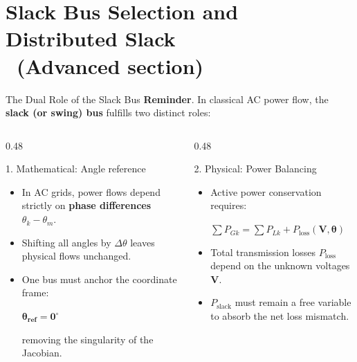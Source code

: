 \section{Slack Bus Selection and Distributed Slack \\ (Advanced section)}

\begin{frame}{The Dual Role of the Slack Bus}
    \textbf{Reminder}. In classical AC power flow, the \textbf{slack (or swing) bus} fulfills two distinct roles:
    
    \begin{columns}[T]
        \begin{column}{0.48\textwidth}
            \begin{block}{1. Mathematical: Angle reference}
                \footnotesize
                \begin{itemize}
                    \item In AC grids, power flows depend strictly on \textbf{phase differences} $\theta_k - \theta_m$.
                    \item Shifting all angles by $\Delta \theta$ leaves physical flows unchanged.
                    \item One bus must anchor the coordinate frame:
                    \begin{center}
                        $\mathbf{\theta_{\text{ref}} = 0^\circ}$
                    \end{center}
                    removing the singularity of the Jacobian.
                \end{itemize}
            \end{block}
        \end{column}
        
        \begin{column}{0.48\textwidth}
            \begin{block}{2. Physical: Power Balancing}
                \footnotesize
                \begin{itemize}
                    \item Active power conservation requires:
                    \begin{center}
                        $\sum P_{Gk} = \sum P_{Lk} + P_{\text{loss}}(\mathbf{V}, \boldsymbol{\theta})$
                    \end{center}
                    \item Total transmission losses $P_{\text{loss}}$ depend on the unknown voltages $\mathbf{V}$.
                    \item $P_{\text{slack}}$ must remain a free variable to absorb the net loss mismatch.
                \end{itemize}
            \end{block}
        \end{column}
    \end{columns}
\end{frame}


